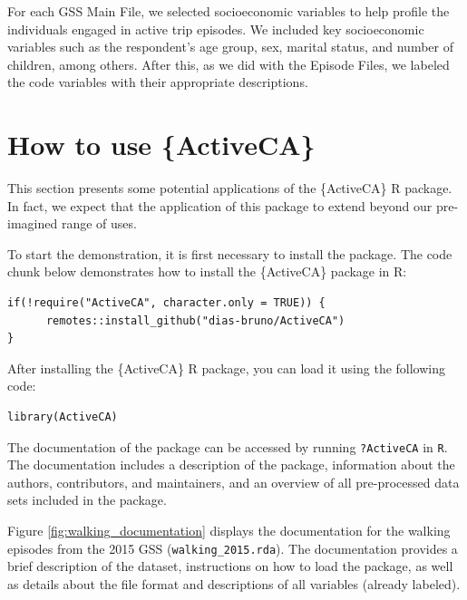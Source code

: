 \documentclass[Royal,times,sageh]{sagej}
\begin{document}
For each GSS Main File, we selected socioeconomic variables to help
profile the individuals engaged in active trip episodes. We included key
socioeconomic variables such as the respondent's age group, sex, marital
status, and number of children, among others. After this, as we did with
the Episode Files, we labeled the code variables with their appropriate
descriptions.

\section{How to use \{ActiveCA\}}\label{how-to-use-activeca}

This section presents some potential applications of the \{ActiveCA\} R
package. In fact, we expect that the application of this package to
extend beyond our pre-imagined range of uses.

To start the demonstration, it is first necessary to install the
package. The code chunk below demonstrates how to install the
\{ActiveCA\} package in R:

\begin{verbatim}
if(!require("ActiveCA", character.only = TRUE)) {
      remotes::install_github("dias-bruno/ActiveCA")
}
\end{verbatim}

After installing the \{ActiveCA\} R package, you can load it using the
following code:

\begin{verbatim}
library(ActiveCA)
\end{verbatim}

The documentation of the package can be accessed by running
\texttt{?ActiveCA} in \texttt{R}. The documentation includes a
description of the package, information about the authors, contributors,
and maintainers, and an overview of all pre-processed data sets included
in the package.

Figure \ref{fig:walking_documentation} displays the documentation for
the walking episodes from the 2015 GSS (\texttt{walking\_2015.rda}). The
documentation provides a brief description of the dataset, instructions
on how to load the package, as well as details about the file format and
descriptions of all variables (already labeled).
\end{document}
